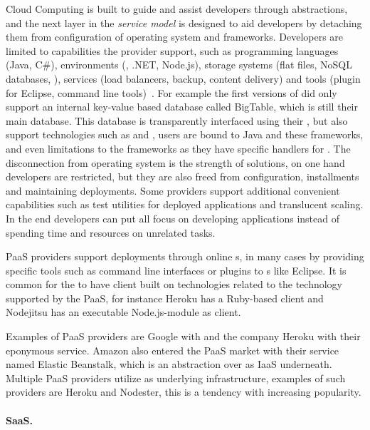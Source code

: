 Cloud Computing is built to guide and assist developers through abstractions, and the next
layer in the \emph{service model} is designed to aid developers by detaching them
from configuration of operating system and frameworks.
Developers are limited to capabilities the provider support,
such as programming languages (Java, C\#), environments (, .NET, Node.js), 
storage systems (flat files, NoSQL databases, ),
services (load balancers, backup, content delivery)
and tools (plugin for Eclipse, command line tools)~\cite{nist:mell11}.
For example the first versions of  did only support
an internal key-value based database called BigTable, which is still their main database.
This database is transparently interfaced using their , 
but also support technologies such as  and ,
users are bound to Java and these frameworks, and even limitations to the frameworks
as they have specific handlers for .
The disconnection from operating system is the strength of  solutions,
on one hand developers are restricted, but they are also freed from
configuration, installments and maintaining deployments.
Some  providers support additional convenient capabilities such as
test utilities for deployed applications and translucent scaling.
In the end developers can put all focus on developing applications 
instead of spending time and resources on unrelated tasks.

PaaS providers support deployments through online s, in many cases by providing 
specific tools such as command line interfaces or plugins to s like Eclipse.
It is common for the  to have client built on technologies related to the technology supported by the PaaS,
for instance Heroku has a Ruby-based client and Nodejitsu has an executable Node.js-module as client.

Examples of PaaS providers are Google with  and
the company Heroku with their eponymous service.
Amazon also entered the PaaS market with their service named Elastic Beanstalk,
which is an abstraction over  as IaaS underneath.
Multiple PaaS providers utilize  as underlying infrastructure, examples of such
providers are Heroku and Nodester, this is a tendency with increasing popularity.

\paragraph{SaaS.}

